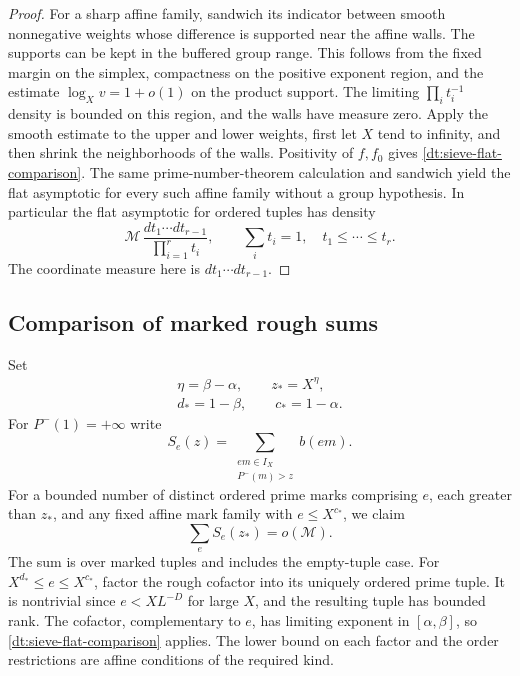 \documentclass[11pt,a4paper]{article}
\theoremstyle{paperplain}
\numberwithin{equation}{section}
\begin{document}
\begin{proof}
For a sharp affine family, sandwich its indicator between smooth
nonnegative weights whose difference is supported near the
affine walls. The supports can be kept in the buffered group
range. This follows from the fixed margin on the simplex,
compactness on the positive exponent region, and the estimate
\(\log_X v=1+o(1)\) on the product support. The limiting
\(\prod_i t_i^{-1}\) density is bounded on this region, and
the walls have measure zero. Apply the smooth estimate
to the upper and lower weights, first let \(X\) tend to
infinity, and then shrink the neighborhoods of the walls.
Positivity of \(f,f_0\) gives \eqref{dt:sieve-flat-comparison}.
The same prime-number-theorem calculation and sandwich yield
the flat asymptotic for every such affine family without a
group hypothesis. In particular the flat asymptotic for ordered
tuples has density
\begin{equation}
 \mathcal M\,
 \frac{dt_1\cdots dt_{r-1}}{\prod_{i=1}^r t_i},
 \qquad \sum_i t_i=1,\quad t_1\le\cdots\le t_r .
 \label{dt:sieve-flat-density}
\end{equation}
The coordinate measure here is \(dt_1\cdots dt_{r-1}\).
\end{proof}

\subsection{Comparison of marked rough sums}
\label{dt:sieve-rough}

Set
\[
 \begin{gathered}
 \eta=\beta-\alpha,\qquad z_*=X^\eta ,\\
 d_*=1-\beta,\qquad c_*=1-\alpha .
 \end{gathered}
\]
For \(P^-(1)=+\infty\) write
\[
 S_e(z)=\sum_{\substack{em\in I_X\\P^-(m)>z}} b(em).
\]
For a bounded number of distinct ordered prime marks comprising
\(e\), each greater than \(z_*\), and any fixed affine mark family
with \(e\le X^{c_*}\), we claim
\begin{equation}
             \sum_e S_e(z_*)=o(\mathcal M).
 \label{dt:sieve-rough-comparison}
\end{equation}
The sum is over marked tuples and includes the empty-tuple case.
For \(X^{d_*}\le e\le X^{c_*}\), factor the rough cofactor into
its uniquely ordered prime tuple. It is nontrivial since
\(e<X L^{-D}\) for large \(X\), and the resulting tuple has
bounded rank. The cofactor, complementary to \(e\), has limiting
exponent in \([\alpha,\beta]\), so \eqref{dt:sieve-flat-comparison}
applies. The lower bound on each factor and the order restrictions
are affine conditions of the required kind.
\end{document}
